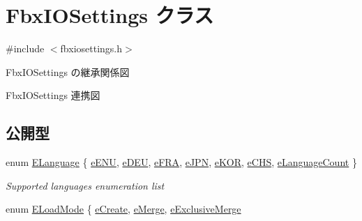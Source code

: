 \hypertarget{class_fbx_i_o_settings}{}\section{Fbx\+I\+O\+Settings クラス}
\label{class_fbx_i_o_settings}


{\ttfamily \#include $<$fbxiosettings.\+h$>$}



Fbx\+I\+O\+Settings の継承関係図


Fbx\+I\+O\+Settings 連携図
\subsection*{公開型}
\begin{DoxyCompactItemize}
\item 
enum \hyperlink{class_fbx_i_o_settings_a84f2effd8e41c382faa5ca58046f323f}{E\+Language} \{ \newline
\hyperlink{class_fbx_i_o_settings_a84f2effd8e41c382faa5ca58046f323fa8fda898bdbd505592c7d7b5971ea07ed}{e\+E\+NU}, 
\hyperlink{class_fbx_i_o_settings_a84f2effd8e41c382faa5ca58046f323fa3af1c95587007b95301ac8f2cf84f545}{e\+D\+EU}, 
\hyperlink{class_fbx_i_o_settings_a84f2effd8e41c382faa5ca58046f323fa9880a81be07b871e6f4e38efc289442a}{e\+F\+RA}, 
\hyperlink{class_fbx_i_o_settings_a84f2effd8e41c382faa5ca58046f323fa57a2d721392084f075cf5826aee4b806}{e\+J\+PN}, 
\newline
\hyperlink{class_fbx_i_o_settings_a84f2effd8e41c382faa5ca58046f323fa733ed54132d846f72dccaf75e223a64e}{e\+K\+OR}, 
\hyperlink{class_fbx_i_o_settings_a84f2effd8e41c382faa5ca58046f323fa9b82a38394a273566c671012ee996dbf}{e\+C\+HS}, 
\hyperlink{class_fbx_i_o_settings_a84f2effd8e41c382faa5ca58046f323fa42634e3786b8c234b00490de78dd7760}{e\+Language\+Count}
 \}\begin{DoxyCompactList}\small\item\em Supported languages enumeration list \end{DoxyCompactList}
\item 
enum \hyperlink{class_fbx_i_o_settings_a7c0c9b5df78863a5d9acdcac80a04211}{E\+Load\+Mode} \{ \hyperlink{class_fbx_i_o_settings_a7c0c9b5df78863a5d9acdcac80a04211a0414070b97a5f0192827ac4f8217cf93}{e\+Create}, 
\hyperlink{class_fbx_i_o_settings_a7c0c9b5df78863a5d9acdcac80a04211ae63d3a1974af470f16b65e334b22b4a7}{e\+Merge}, 
\hyperlink{class_fbx_i_o_settings_a7c0c9b5df78863a5d9acdcac80a04211ad93bf1b6e8c1d02f5f7803826c808d30}{e\+Exclusive\+Merge}

\end{DoxyCompactItemize}

